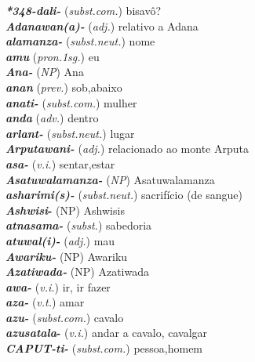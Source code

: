 
\begin{multicols}{2}
	\begin{hangparas}{1em}{1}
		\raggedright%
		\textbf{\emph{\emph{*348}-dali-}} (\emph{subst.com.}) \tabto{1em} bisavô?\\
		\textbf{\emph{Adanawan{(a)}-}} (\emph{adj.}) \tabto{1em} relativo a Adana\\
		\textbf{\emph{alamanza-}} (\emph{subst.neut.}) \tabto{1em} nome\\
		\textbf{\emph{amu}} (\emph{pron.1sg.}) \tabto{1em} eu\\
		\textbf{\emph{Ana-}} (\emph{NP}) \tabto{1em} Ana\\
		\textbf{\emph{anan}} (\emph{prev.}) \tabto{1em} sob,abaixo\\
		\textbf{\emph{anati-}} (\emph{subst.com.}) \tabto{1em} mulher\\
		\textbf{\emph{anda}} (\emph{adv.}) \tabto{1em} dentro\\
		\textbf{\emph{arlant-}} (\emph{subst.neut.}) \tabto{1em} lugar\\
		\textbf{\emph{Arputawani-}} (\emph{adj.}) \tabto{1em} relacionado ao monte Arputa\\
		\textbf{\emph{asa-}} (\emph{v.i.}) \tabto{1em} sentar,estar\\
		\textbf{\emph{Asatuwalamanza-}} (\emph{NP}) \tabto{1em} Asatuwalamanza\\
		\textbf{\emph{asharimi{(s)}-}} (\emph{subst.neut.}) \tabto{1em} sacrifício (de sangue)\\
		\textbf{\emph{Ashwisi}-} (NP) \tabto{1em} Ashwisis\\
		\textbf{\emph{atnasama-}} (\emph{subst.}) \tabto{1em} sabedoria\\
		\textbf{\emph{atuwal{(i)}-}} (\emph{adj.}) \tabto{1em} mau\\
		\columnbreak%
		\textbf{\emph{Awariku-}} (NP) \tabto{1em} Awariku\\
		\textbf{\emph{Azatiwada-}} (NP) \tabto{1em} Azatiwada\\
		\textbf{\emph{awa-}} (\emph{v.i.}) \tabto{1em} ir, ir fazer\\
		\textbf{\emph{aza-}} (\emph{v.t.}) \tabto{1em} amar\\
		\textbf{\emph{azu-}} (\emph{subst.com.}) \tabto{1em} cavalo\\
		\textbf{\emph{azusatala}-} (\emph{v.i.}) \tabto{1em} andar a cavalo, cavalgar\\
		\textbf{\emph{\emph{CAPUT}-ti-}} (\emph{subst.com.}) \tabto{1em} pessoa,homem\\

\end{hangparas}
\end{multicols}
